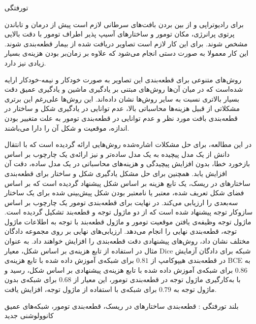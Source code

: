 


\pagestyle{empty}

‌تورفتگی

برای رادیوتراپی و از بین بردن بافت‌های سرطانی لازم است پیش از درمان و تاباندن پرتوی پرانرژی، مکان تومور و ساختارهای آسیپ پذیر اطراف تومور با دقت بالایی مشخص شوند. برای این کار لازم است تصاویر دریافت شده از بیمار قطعه‌بندی شوند. این کار معمولا به صورت دستی انجام می‌شود که علاوه بر زمان‌بر بودن هزینه‌ی بسیار زیادی نیز دارد. 

روش‌های متنوعی برای قطعه‌بندی این تصاویر به صورت خودکار و نیمه-خودکار ارایه شده‌است که در میان آن‌ها روش‌های مبتنی بر یادگیری ماشین و یادگیری عمیق دقت بسیار بالاتری نسبت به سایر روش‌ها نشان داده‌اند. این روش‌ها علی‌رغم این برتری مشکلاتی از قبیل هزینه‌ها محاسباتی بالا، عدم توانایی در یادگیری شکل و ساختار در قطعه‌بندی بافت مورد نظر و عدم توانایی در قطعه‌بندی تومور به علت متغییر بودن اندازه، موقعیت و شکل آن را دارا می‌باشند. 

در این مطالعه، برای حل مشکلات اشاره‌شده روش‌هایی ارائه گردیده است که با انتقال دانش از یک مدل پیچیده به یک مدل ساده‌تر و نیز ارائه‌ی یک چارچوب بر اساس بازخورد خطا، بدون افزایش پیچیدگی و هزینه‌های محاسباتی در یک مدل ساده، دقت آن افزایش یابد. همچنین برای حل مشکل یادگیری شکل و ساختار برای قطعه‌بندی ساختارهای در ریسک، یک تابع هزینه بر اساس شکل پیشنهاد گردیده است که بر اساس فضای شکل تعریف شده، معتبر یا نامعتبر بودن شکل پیش‌بینی شده برای یک ساختار سه‌بعدی را ارزیابی می‌کند. در نهایت برای قطعه‌بندی تومور یک چارچوب بر اساس سازوکار توجه پیشنهاد شده است که از دو ماژول توجه و قطعه‌بند تشکیل گردیده است. ماژول توجه وظیفه‌ی یافتن موقعیت تومور و ماژول قطعه‌بند با توجه به اطلاعات ماژول توجه، قطعه‌بندی نهایی را انجام می‌دهد. ارزیابی‌های نهایی بر روی مجموعه دادگان مختلف نشان داد، روش‌های پیشنهادی دقت قطعه‌بندی را افزایش خواهند داد. به عنوان مثال در استفاده از تابع هزینه‌ی بر اساس شکل، معیار Dice شبکه برای دادگان آزمایش در قطعه‌بندی هیپوکامپ از $0.81$ برای شبکه‌ی آموزش داده شده با تابع هزینه‌ی BCE به $0.86$ برای شبکه‌ی آموزش داده شده با تابع هزینه‌ی پیشنهادی بر اساس شکل، رسید و با به‌کارگیری ماژول توجه در قطعه‌بندی تومور، این معیار از $0.68$ برای شبکه‌ی بدون ماژول توجه به $0.79$ برای شبکه‌ی با استفاده از ماژول توجه، افزایش یافت.


‌بلند
‌تورفتگی : 
قطعه‌بندی ساختار‌های در ریسک، قطعه‌بندی تومور، شبکه‌های عمیق کانوولوشنی
‌جدید

